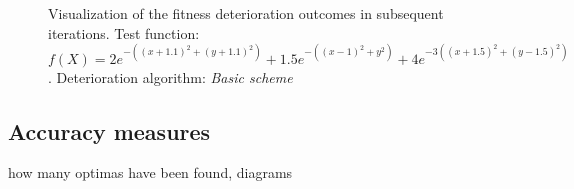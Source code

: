 \begin{figure}
  \centering
  \caption{Visualization of the fitness deterioration outcomes in subsequent
  iterations. Test function: $f(X) = 2e^{-((x+1.1)^2 + (y+1.1)^2)} + 1.5e^{-((x-1)^2 + y^2)} +
  4e^{-3((x+1.5)^2 + (y-1.5)^2)}$. Deterioration algorithm: \textit{Basic
  scheme} }
  \label{seqNichingPop}
\end{figure}



\subsection{Accuracy measures}
how many optimas have been found, diagrams




